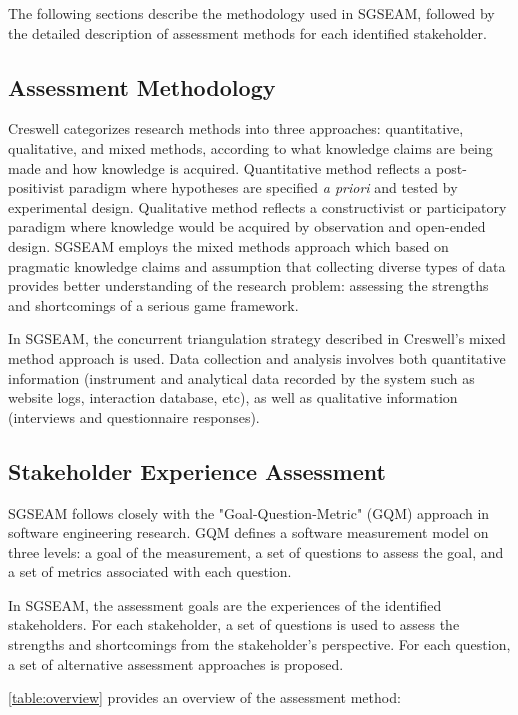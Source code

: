 \documentclass[11pt]{article}
\begin{document}
The following sections describe the methodology used in SGSEAM, followed by the detailed
description of assessment methods for each identified stakeholder.

\subsection{Assessment Methodology}
Creswell \cite{creswell2003} categorizes research methods into three approaches:
quantitative, qualitative, and mixed methods, according to what knowledge claims are being made
and how knowledge is acquired. Quantitative method reflects a post-positivist paradigm where
hypotheses are specified {\em a priori} and tested by experimental design. Qualitative method
reflects a constructivist or participatory paradigm where knowledge would be acquired by
observation and open-ended design. SGSEAM employs the mixed methods approach which based on
pragmatic knowledge claims and assumption that collecting diverse types of data provides better
understanding of the research problem: assessing the strengths and shortcomings of a serious game
framework.

In SGSEAM, the concurrent triangulation strategy described in Creswell's mixed method approach
is used.  Data collection and analysis involves both quantitative information (instrument and
analytical data recorded by the system such as website logs, interaction database, etc), as well
as qualitative information (interviews and questionnaire responses).

\subsection{Stakeholder Experience Assessment}

SGSEAM follows closely with the "Goal-Question-Metric" (GQM) approach \cite{caldiera1994goal} in
software engineering research. GQM defines a software  measurement model on three levels: a goal
of the measurement, a set of questions to assess the goal, and a set of metrics associated with
each question.

In SGSEAM, the assessment goals are the experiences of the identified stakeholders. For each
stakeholder, a set of questions is used to assess the strengths and shortcomings from the
stakeholder's perspective. For each question, a set of alternative assessment approaches is
proposed.

\autoref{table:overview} provides an overview of the assessment method:
\end{document}
